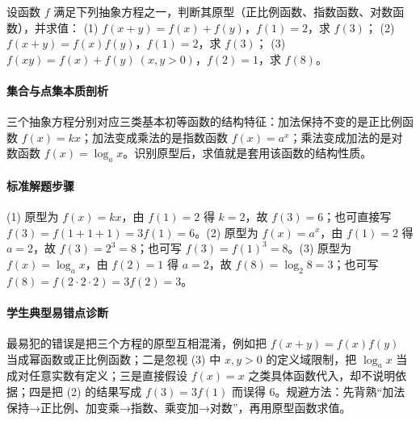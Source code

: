 \begin{problem}
设函数 $f$ 满足下列抽象方程之一，判断其原型（正比例函数、指数函数、对数函数），并求值：
(1) $f(x+y)=f(x)+f(y)$，$f(1)=2$，求 $f(3)$；
(2) $f(x+y)=f(x)f(y)$，$f(1)=2$，求 $f(3)$；
(3) $f(xy)=f(x)+f(y)\ (x,y>0)$，$f(2)=1$，求 $f(8)$。
\end{problem}
\begin{solution}
\paragraph{集合与点集本质剖析}
三个抽象方程分别对应三类基本初等函数的结构特征：加法保持不变的是正比例函数 $f(x)=kx$；加法变成乘法的是指数函数 $f(x)=a^x$；乘法变成加法的是对数函数 $f(x)=\log_a x$。识别原型后，求值就是套用该函数的结构性质。
\paragraph{标准解题步骤}
(1) 原型为 $f(x)=kx$，由 $f(1)=2$ 得 $k=2$，故 $f(3)=6$；也可直接写 $f(3)=f(1+1+1)=3f(1)=6$。(2) 原型为 $f(x)=a^x$，由 $f(1)=2$ 得 $a=2$，故 $f(3)=2^3=8$；也可写 $f(3)=f(1)^3=8$。(3) 原型为 $f(x)=\log_a x$，由 $f(2)=1$ 得 $a=2$，故 $f(8)=\log_2 8=3$；也可写 $f(8)=f(2\cdot2\cdot2)=3f(2)=3$。
\paragraph{学生典型易错点诊断}
最易犯的错误是把三个方程的原型互相混淆，例如把 $f(x+y)=f(x)f(y)$ 当成幂函数或正比例函数；二是忽视 (3) 中 $x,y>0$ 的定义域限制，把 $\log_a x$ 当成对任意实数有定义；三是直接假设 $f(x)=x$ 之类具体函数代入，却不说明依据；四是把 (2) 的结果写成 $f(3)=3f(1)$ 而误得 $6$。规避方法：先背熟“加法保持→正比例、加变乘→指数、乘变加→对数”，再用原型函数求值。
\end{solution}

